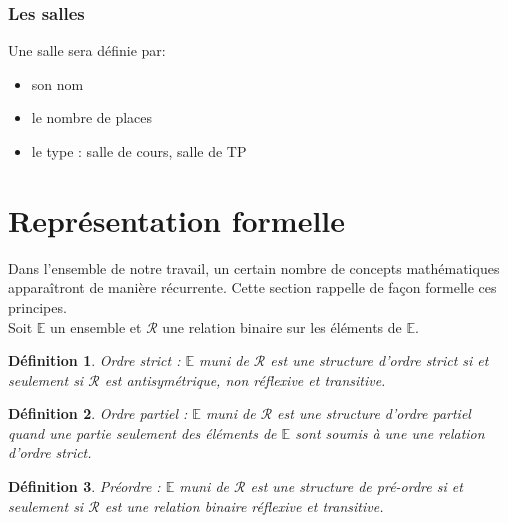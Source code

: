 \documentclass[12pt,a4paper,french]{article}
\begin{document}
\subsubsection{Les salles}
Une salle sera définie par:
\begin{itemize}
\item son nom
\item le nombre de places
\item le type : salle de cours, salle de TP
\end{itemize}

\newpage
\section{Représentation formelle}

\newtheorem{definition}{Définition}
\newtheorem{lemme}{Lemme}
\newtheorem{proposition}{Proposition}
\newtheorem{theoreme}{Thorme}
\newtheorem{eg}{Exemple}
\newcommand{\ds}{\displaystyle}



Dans l'ensemble de notre travail, un certain nombre de concepts mathématiques apparaîtront de manière récurrente. Cette section rappelle de façon formelle ces principes.\\

Soit $\mathbb{E}$ un ensemble et  $\mathcal{R}$ une relation binaire sur les éléments de $\mathbb{E}$. 

\begin{definition}{\emph{Ordre strict : }}
$\mathbb{E}$ muni de $\mathcal{R}$ est une structure d'ordre strict si et seulement si $\mathcal{R}$ est antisymétrique, non réflexive et transitive.\\
\end{definition}

\begin{definition}{\emph{Ordre partiel :} }
$\mathbb{E}$ muni de $\mathcal{R}$ est une structure d'ordre partiel quand une partie seulement des éléments de $\mathbb{E}$ sont soumis à une une relation d'ordre strict.\\
\end{definition}

\begin{definition}{\emph{Préordre :} }
$\mathbb{E}$ muni de $\mathcal{R}$ est une structure de pré-ordre si et seulement si $\mathcal{R}$  est une relation binaire réflexive et transitive.\\
\end{definition}
\end{document}
